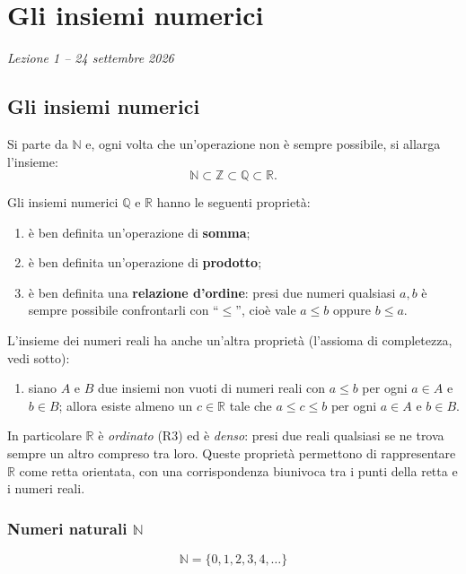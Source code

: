 \documentclass[11pt,a4paper]{article}
\begin{document}
\section[Gli insiemi numerici (Lezione 1 -- 24 settembre 2026)]{Gli insiemi numerici}
\noindent\emph{Lezione 1 -- 24 settembre 2026}
\subsection{Gli insiemi numerici}

Si parte da $\mathbb{N}$ e, ogni volta che un'operazione non è sempre
possibile, si allarga l'insieme:
\[
\mathbb{N} \subset \mathbb{Z} \subset \mathbb{Q} \subset \mathbb{R}.
\]

Gli insiemi numerici $\mathbb{Q}$ e $\mathbb{R}$ hanno le seguenti proprietà:
\begin{enumerate}
    \item[(R1)] è ben definita un'operazione di \textbf{somma};
    \item[(R2)] è ben definita un'operazione di \textbf{prodotto};
    \item[(R3)] è ben definita una \textbf{relazione d'ordine}: presi due numeri qualsiasi $a, b$ è sempre possibile confrontarli con ``$\leq$'', cioè vale $a \leq b$ oppure $b \leq a$.
\end{enumerate}
L'insieme dei numeri reali ha anche un'altra proprietà (l'assioma di completezza, vedi sotto):
\begin{enumerate}
    \item[(R4)] siano $A$ e $B$ due insiemi non vuoti di numeri reali con $a \leq b$ per ogni $a \in A$ e $b \in B$; allora esiste almeno un $c \in \mathbb{R}$ tale che $a \leq c \leq b$ per ogni $a \in A$ e $b \in B$.
\end{enumerate}
In particolare $\mathbb{R}$ è \emph{ordinato} (R3) ed è \emph{denso}: presi due reali qualsiasi se ne trova sempre un altro compreso tra loro. Queste proprietà permettono di rappresentare $\mathbb{R}$ come retta orientata, con una corrispondenza biunivoca tra i punti della retta e i numeri reali.

\subsubsection{Numeri naturali $\mathbb{N}$}

\[
\mathbb{N} = \{0, 1, 2, 3, 4, \dots\}
\]
\end{document}
